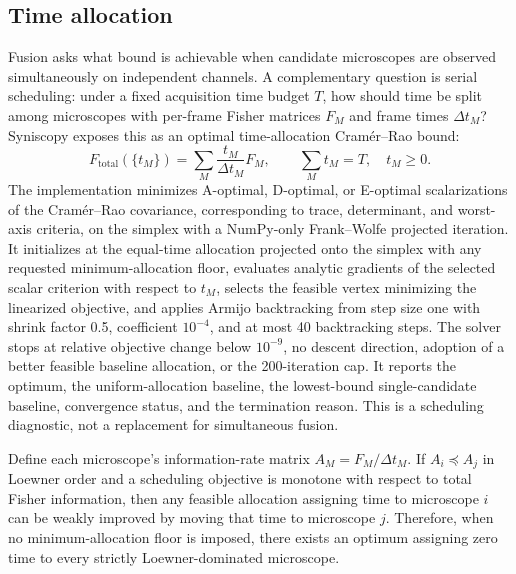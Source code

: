 \subsection{Time allocation}

Fusion asks what bound is achievable when candidate microscopes are observed simultaneously on independent channels. A complementary question is serial scheduling: under a fixed acquisition time budget $T$, how should time be split among microscopes with per-frame Fisher matrices $F_M$ and frame times $\Delta t_M$? Syniscopy exposes this as an optimal time-allocation Cram\'{e}r--Rao bound:
\begin{equation}
  F_{\mathrm{total}}(\{t_M\}) =
  \sum_M \frac{t_M}{\Delta t_M}F_M,
  \qquad
  \sum_M t_M=T,\quad t_M\ge 0 .
\end{equation}
The implementation minimizes A-optimal, D-optimal, or E-optimal scalarizations of the Cram\'{e}r--Rao covariance, corresponding to trace, determinant, and worst-axis criteria, on the simplex with a NumPy-only Frank--Wolfe projected iteration. It initializes at the equal-time allocation projected onto the simplex with any requested minimum-allocation floor, evaluates analytic gradients of the selected scalar criterion with respect to $t_M$, selects the feasible vertex minimizing the linearized objective, and applies Armijo backtracking from step size one with shrink factor 0.5, coefficient $10^{-4}$, and at most 40 backtracking steps. The solver stops at relative objective change below $10^{-9}$, no descent direction, adoption of a better feasible baseline allocation, or the 200-iteration cap. It reports the optimum, the uniform-allocation baseline, the lowest-bound single-candidate baseline, convergence status, and the termination reason. This is a scheduling diagnostic, not a replacement for simultaneous fusion.

\begin{remark}
\label{rem:loewner-dominance-pruning}
Define each microscope's information-rate matrix $A_M=F_M/\Delta t_M$. If $A_i\preceq A_j$ in Loewner order and a scheduling objective is monotone with respect to total Fisher information, then any feasible allocation assigning time to microscope $i$ can be weakly improved by moving that time to microscope $j$. Therefore, when no minimum-allocation floor is imposed, there exists an optimum assigning zero time to every strictly Loewner-dominated microscope.
\end{remark}

